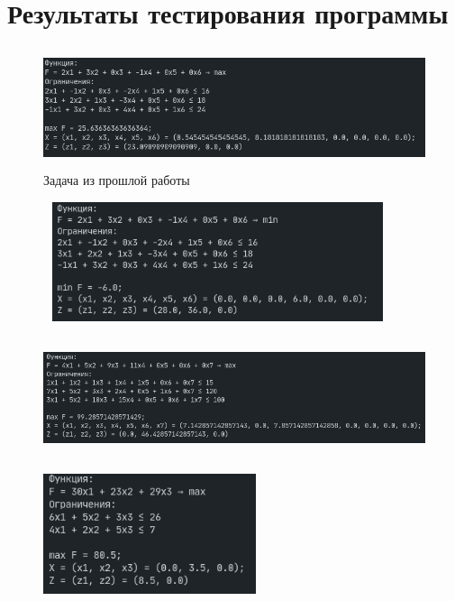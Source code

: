 \documentclass[a4paper,12pt]{article}
\begin{document}
\pagebreak

\section{\normalsize{Результаты тестирования программы}}
\begin{flushleft}
\justify
\begin{figure}[H]
  \includegraphics[width=12.25cm,height=3.5cm]{images/output1.png}
  \centering
  \caption{Задача из прошлой работы}
\end{figure}
\begin{figure}[H]
  \includegraphics[width=10.25cm,height=3.5cm]{images/output2.png}
  \centering
  \caption{}
\end{figure}
\begin{figure}[H]
  \includegraphics[width=12.25cm,height=3.5cm]{images/output3.png}
  \centering
  \caption{}
\end{figure}
\begin{figure}[H]
  \includegraphics[width=6.25cm,height=3.5cm]{images/output4.png}

\end{figure}
\end{flushleft}
\end{document}
